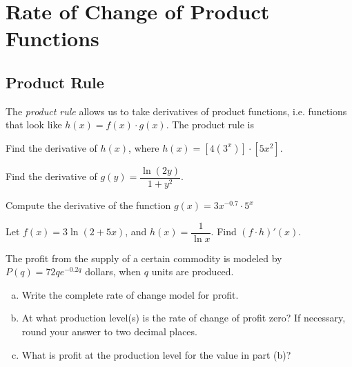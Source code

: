 \documentclass[notes]{subfiles}
\begin{document}
	\setcounter{section}{5}
	\setcounter{ex}{0}
	\fancyhead[LO,RE]{\bfseries  \currentname}
	\fancyfoot[C]{{}}
	\fancyfoot[RO,LE]{\large \thepage}	%


\section*{Rate of Change of Product Functions}\label{cs36}
	\subsection*{Product Rule}
		The \emph{product rule} allows us to take derivatives of product functions, i.e. functions that look like $h(x) = f(x)\cdot g(x)$.  The product rule is
			
		\begin{ex}
			Find the derivative of $h(x)$, where $h(x) = [4(3^x)]\cdot [5x^2]$.  
		\end{ex}
			
		\begin{ex}
			Find the derivative of $g(y)=\dfrac{\ln (2y)}{1+y^2}$.   
		\end{ex}
			\newpage
			
		\begin{ex}
			Compute the derivative of the function $g(x) = 3x^{-0.7}\cdot 5^x$ 
		\end{ex}
			
		\begin{ex}
			Let $f(x) = 3\ln (2+5x)$, and $h(x) = \dfrac{1}{\ln x}$.  Find $(f\cdot h)'(x)$. 
		\end{ex}
		
		\begin{ex}
			The profit from the supply of a certain commodity is modeled by $P(q) = 72qe^{-0.2q}$ dollars, when $q$ units are produced.
				\begin{enumerate}[(a)]
					\item Write the complete rate of change model for profit.  
						
					\item At what production level(s) is the rate of change of profit zero?  If necessary, round your answer to two decimal places.  
					\item What is profit at the production level for the value in part (b)?  
				\end{enumerate}
		\end{ex}
			\newpage
			
\end{document}
